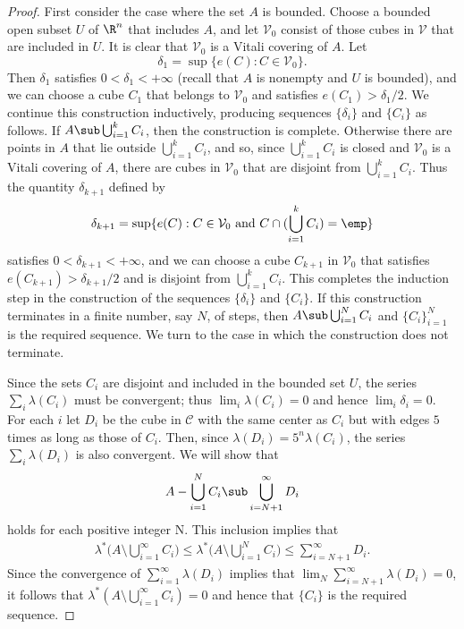 \begin{proof}
First consider the case where the set $A$ is bounded. Choose a bounded open subset $U$ of $\R^n$ that includes $A$, and let $\mathcal{V}_0$ consist of those cubes in $\mathcal{V}$ that are included in $U$. It is clear that $\mathcal{V}_0$ is a Vitali covering of $A$. Let
\[\delta_1=\sup\{e(C):C\in\mathcal{V}_0\}.\]
Then $\delta_1$ satisfies $0<\delta_1<+\infty$ (recall that $A$ is nonempty and $U$ is bounded), and we can choose a cube $C_1$ that belongs to $\mathcal{V}_0$ and satisfies $e(C_1)>\delta_1/2$. We continue this construction inductively, producing sequences $\{\delta_i\}$ and $\{C_i\}$ as follows. If $A\sub\bigcup_{i=1}^{k}C_i$, then the construction is complete. Otherwise there are points in $A$ that lie outside $\bigcup_{i=1}^{k}C_i$, and so, since $\bigcup_{i=1}^{k}C_i$ is closed and $\mathcal{V}_0$ is a Vitali covering of $A$, there are cubes in $\mathcal{V}_0$ that are disjoint from $\bigcup_{i=1}^{k}C_i$. Thus the quantity $\delta_{k+1}$ defined by
\[\delta_{k+1}=\sup\{e(C):C\in\mathcal{V}_0\text{ and }C\cap(\bigcup_{i=1}^{k}C_i)=\emp\}\]
satisfies $0<\delta_{k+1}<+\infty$, and we can choose a cube $C_{k+1}$ in $\mathcal{V}_0$ that satisfies $e(C_{k+1})>\delta_{k+1}/2$ and is disjoint from $\bigcup_{i=1}^{k}C_i$. This completes the induction step in the construction of the sequences $\{\delta_i\}$ and $\{C_i\}$. If this construction terminates in a finite number, say $N$, of steps, then $A\sub\bigcup_{i=1}^{N}C_i$ and $\{C_i\}_{i=1}^{N}$ is the required sequence. We turn to the case in which the construction does not terminate.\par
Since the sets $C_i$ are disjoint and included in the bounded set $U$, the series $\sum_i\lambda(C_i)$ must be convergent; thus $\lim_i\lambda(C_i)=0$ and hence $\lim_i\delta_i=0$. For each $i$ let $D_i$ be the cube in $\mathcal{C}$ with the same center as $C_i$ but with edges $5$ times as long as those of $C_i$. Then, since $\lambda(D_i)=5^n\lambda(C_i)$, the series $\sum_i\lambda(D_i)$ is also convergent. We will show that
\begin{align}\label{Vitali covering-1}
A-\bigcup_{i=1}^{N}C_i\sub\bigcup_{i=N+1}^{\infty}D_i
\end{align}
holds for each positive integer N. This inclusion implies that
\begin{align*}
\lambda^*\Big(A\setminus\bigcup_{i=1}^{\infty}C_i\Big)\leq\lambda^*\Big(A\setminus\bigcup_{i=1}^{N}C_i\Big)\leq\sum_{i=N+1}^{\infty}D_i.
\end{align*}
Since the convergence of $\sum_{i=1}^{\infty}\lambda(D_i)$ implies that $\lim_{N}\sum_{i=N+1}^{\infty}\lambda(D_i)=0$, it follows that $\lambda^*(A\setminus\bigcup_{i=1}^{\infty}C_i)=0$ and hence that $\{C_i\}$ is the required sequence.\par

\end{proof}
